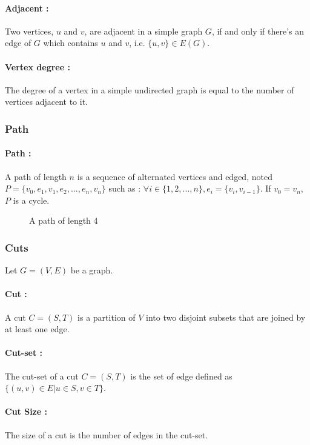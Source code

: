 \paragraph{Adjacent :}
Two vertices, $u$ and $v$, are adjacent in a simple graph $G$, if and only if
there's an edge of $G$ which contains $u$ and $v$, i.e. $\{u,v\} \in E(G)$.

\paragraph{Vertex degree :}
The degree of a vertex in a simple undirected graph is equal to the number of
vertices adjacent to it.

\subsubsection{Path}
\paragraph{Path :}
A path of length $n$ is a sequence of alternated vertices and edged, noted
$P = \{v_0, e_1, v_1, e_2, ..., e_n, v_n\}$ such as :
$\forall i \in \{1,2, ..., n\}, e_i = \{v_i, v_{i-1}\}$. If $v_0 = v_n$, $P$ is
a cycle.

\begin{figure}[!h]
  \begin{center}
    
  \end{center}
  \caption{A path of length 4}
\end{figure}

\subsubsection{Cuts}
Let $G=(V,E)$ be a graph.
\paragraph{Cut :}
A cut $C=(S,T)$ is a partition of $V$ into two disjoint subsets that are joined by at least one edge.

\paragraph{Cut-set :}
The cut-set of a cut $C=(S,T)$ is the set of edge defined as $\{(u,v)\in E | u\in S, v \in T\}$.

\paragraph{Cut Size :}
The size of a cut is the number of edges in the cut-set.


